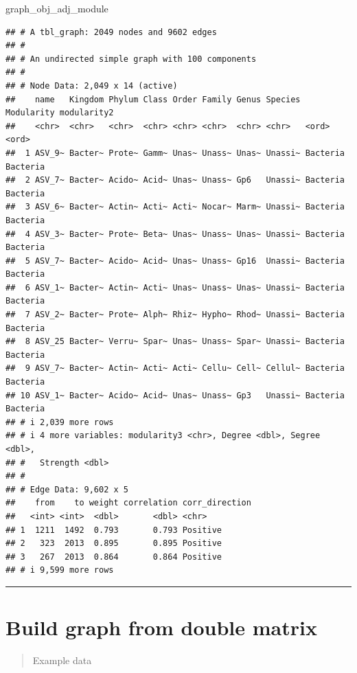 \documentclass[
]{book}
\newenvironment{Shaded}{\begin{snugshade}}{\end{snugshade}}
\newcommand{\NormalTok}[1]{#1}
\begin{document}
\begin{Shaded}
\begin{Highlighting}[]
\NormalTok{graph\_obj\_adj\_module}
\end{Highlighting}
\end{Shaded}

\begin{verbatim}
## # A tbl_graph: 2049 nodes and 9602 edges
## #
## # An undirected simple graph with 100 components
## #
## # Node Data: 2,049 x 14 (active)
##    name   Kingdom Phylum Class Order Family Genus Species Modularity modularity2
##    <chr>  <chr>   <chr>  <chr> <chr> <chr>  <chr> <chr>   <ord>      <ord>      
##  1 ASV_9~ Bacter~ Prote~ Gamm~ Unas~ Unass~ Unas~ Unassi~ Bacteria   Bacteria   
##  2 ASV_7~ Bacter~ Acido~ Acid~ Unas~ Unass~ Gp6   Unassi~ Bacteria   Bacteria   
##  3 ASV_6~ Bacter~ Actin~ Acti~ Acti~ Nocar~ Marm~ Unassi~ Bacteria   Bacteria   
##  4 ASV_3~ Bacter~ Prote~ Beta~ Unas~ Unass~ Unas~ Unassi~ Bacteria   Bacteria   
##  5 ASV_7~ Bacter~ Acido~ Acid~ Unas~ Unass~ Gp16  Unassi~ Bacteria   Bacteria   
##  6 ASV_1~ Bacter~ Actin~ Acti~ Unas~ Unass~ Unas~ Unassi~ Bacteria   Bacteria   
##  7 ASV_2~ Bacter~ Prote~ Alph~ Rhiz~ Hypho~ Rhod~ Unassi~ Bacteria   Bacteria   
##  8 ASV_25 Bacter~ Verru~ Spar~ Unas~ Unass~ Spar~ Unassi~ Bacteria   Bacteria   
##  9 ASV_7~ Bacter~ Actin~ Acti~ Acti~ Cellu~ Cell~ Cellul~ Bacteria   Bacteria   
## 10 ASV_1~ Bacter~ Acido~ Acid~ Unas~ Unass~ Gp3   Unassi~ Bacteria   Bacteria   
## # i 2,039 more rows
## # i 4 more variables: modularity3 <chr>, Degree <dbl>, Segree <dbl>,
## #   Strength <dbl>
## #
## # Edge Data: 9,602 x 5
##    from    to weight correlation corr_direction
##   <int> <int>  <dbl>       <dbl> <chr>         
## 1  1211  1492  0.793       0.793 Positive      
## 2   323  2013  0.895       0.895 Positive      
## 3   267  2013  0.864       0.864 Positive      
## # i 9,599 more rows
\end{verbatim}

\begin{center}\rule{0.5\linewidth}{0.5pt}\end{center}

\section{Build graph from double matrix}\label{build-graph-from-double-matrix}

\begin{quote}
Example data
\end{quote}
\end{document}
